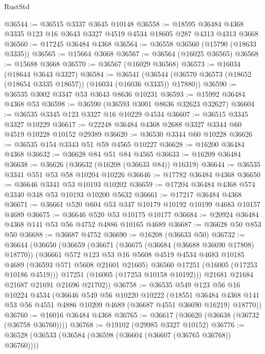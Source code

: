 \begin{lexlean}{RustStd}
\begin{coremodule}
@36544 := @36515 @3337 @3645 @10148
@36558 := @18595 @36484 @4368 @3335 @123 @16 @3643 @3327 @4519 @4534 @18605 @287 @4313 @4313 @3668
@36560 := @17245 @36484 @4368
@36564 := @36558 @36560 (@15790 (@18633 @3335))
@36565 := @15664 @3668
@36567 := @36564 (@16025 @36565)
@36568 := @15688 @3668
@36570 := @36567 (@16029 @36568)
@36573 := @16034 (@18644 @3643 @3327)
@36584 := @36541
    (@36544 (@36570 @36573 (@18652 (@18654 @3335 @18657)) (@16034 (@16036 @3335)) @17880))
@36590 := @36535 @3002 @3347 @53 @3643 @8636 @10231
@36593 := @15992 @36484 @4368 @53
@36598 := @36590 (@36593 @3001 @8636 @32623 @32627)
@36604 := @36535 @3345 @123 @3327 @16 @10229 @4534
@36607 := @36515 @3345 @3327 @10229
@36617 := @22248 @36484 @4368 @2688 @3327 @3344 @60 @4519 @10228 @10152 @29389
@36620 := @36530 @3344 @60 @10228
@36626 := @36535 @154 @3343 @51 @59 @4565 @10227
@36628 := @16200 @36484 @4368
@36632 := @36628 @84 @51 @84 @4565
@36633 := @16209 @36484
@36638 := @36626 (@36632 (@16208 (@36633 @84)) @16319)
@36644 := @36535 @3341 @551 @53 @58 @10204 @10226
@36646 := @17782 @36484 @4368
@36650 := @36646 @3341 @53 @10193 @10202
@36659 := @17204 @36484 @4368 @574 @3340 @348 @53 @10193 @10200 @5632
@36661 := @17217 @36484 @4368
@36671 := @36661 @520 @604 @53 @347 @10179 @10192 @10199 @4683 @10157 @4689
@36675 := @36646 @520 @53 @10175 @10177
@36684 := @20924 @36484 @4368 @141 @53 @56 @4752 @4886 @10165 @4689
@36687 := @36628 @50 @853 @50
@36688 := @36687 @4752
@36690 := @16208 (@36633 @50)
@36732 := @36644
    (@36650
      (@36659
        (@36671
          (@36675 (@36684 (@36688 @36690 @17808) @18770))
          (@36661
            @572
            @123
            @53
            @16
            @5608
            @4519
            @4534
            @4683
            @10185
            @4689
            (@36593 @571 @5608 @21601 @21605)
            @36560
            @17251
            (@16005 (@17253 @10186 @4519)))
          @17251
          (@16005 (@17253 @10158 @10192)))
        @21681
        @21684
        @21687
        @21691
        @21696
        @21702))
@36758 := @36535
    @549
    @123
    @56
    @16
    @10224
    @4534
    (@36646
      @549
      @56
      @10220
      @10222
      (@18551
        @36484
        @4368
        @141
        @53
        @56
        @4551
        @4886
        @10209
        @4689
        (@36687 @4551 @36690 @16219)
        @18770))
@36760 := @16016 @36484 @4368
@36765 := @36617 (@36620 (@36638 (@36732 (@36758 @36760))))
@36768 := @19102 (@29985 @3327 @10152)
@36776 := @36528 (@36533 (@36584 (@36598 (@36604 (@36607 (@36765 @36768)) @36760))))

\end{coremodule}
\end{lexlean}
